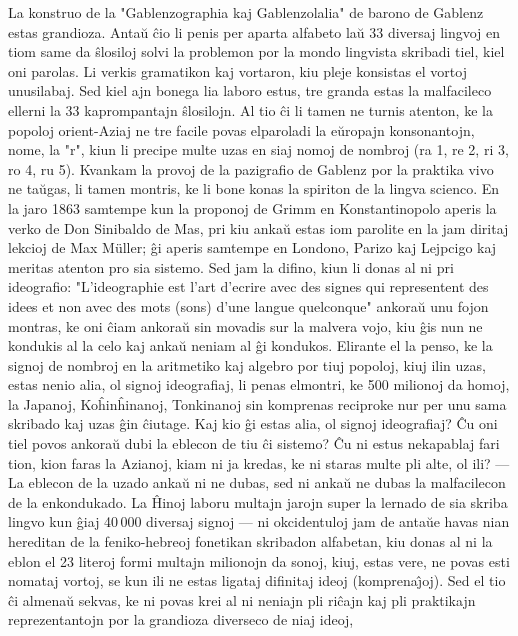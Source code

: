    La konstruo de la "Gablenzographia kaj Gablenzolalia" de barono
de Gablenz estas grandioza. Anta\u u \^cio li penis per aparta
alfabeto la\u u 33 diversaj lingvoj en tiom same da \^slosiloj solvi
la problemon por la mondo lingvista skribadi tiel, kiel oni parolas.
Li verkis gramatikon kaj vortaron, kiu pleje konsistas el vortoj
unusilabaj. Sed kiel ajn bonega lia laboro estus, tre granda estas
la malfacileco ellerni la 33 kaprompantajn \^slosilojn. Al tio \^ci
li tamen ne turnis atenton, ke la popoloj orient-Aziaj ne tre facile
povas elparoladi la e\u uropajn konsonantojn, nome, la "r", kiun
li precipe multe uzas en siaj nomoj de nombroj (ra 1, re 2, ri 3, ro
4, ru 5). Kvankam la provoj de la pazigrafio de Gablenz por la
praktika vivo ne ta\u ugas, li tamen montris, ke li bone konas la
spiriton de la lingva scienco. En la jaro 1863 samtempe kun la
proponoj de Grimm en Konstantinopolo aperis la verko de Don
Sinibaldo de Mas, pri kiu anka\u u estas iom parolite en la jam
diritaj lekcioj de Max Müller; \^gi aperis samtempe en Londono,
Parizo kaj Lejpcigo kaj meritas atenton pro sia sistemo. Sed jam la
difino, kiun li donas al ni pri ideografio: "L'ideographie est
l'art d'ecrire avec des signes qui representent des idees et non
avec des mots (sons) d'une langue quelconque" ankora\u u unu fojon
montras, ke oni \^ciam ankora\u u sin movadis sur la malvera vojo,
kiu \^gis nun ne kondukis al la celo kaj anka\u u neniam al \^gi
kondukos. Elirante el la penso, ke la signoj de nombroj en la
aritmetiko kaj algebro por tiuj popoloj, kiuj ilin uzas, estas nenio
alia, ol signoj ideografiaj, li penas elmontri, ke 500 milionoj da
homoj, la Japanoj, Ko\^hin\^hinanoj, Tonkinanoj sin komprenas
reciproke nur per unu sama skribado kaj uzas \^gin \^ciutage. Kaj
kio \^gi estas alia, ol signoj ideografiaj? \^Cu oni tiel povos
ankora\u u dubi la eblecon de tiu \^ci sistemo? \^Cu ni estus
nekapablaj fari tion, kion faras la Azianoj, kiam ni ja kredas, ke
ni staras multe pli alte, ol ili? --- La eblecon de la uzado anka\u
u ni ne dubas, sed ni anka\u u ne dubas la malfacilecon de la
enkondukado. La \^Hinoj laboru multajn jarojn super la lernado de
sia skriba lingvo kun \^giaj 40\,000 diversaj signoj --- ni
okcidentuloj jam de anta\u ue havas nian hereditan de la
feniko-hebreoj fonetikan skribadon alfabetan, kiu donas al ni la
eblon el 23 literoj formi multajn milionojn da sonoj, kiuj, estas
vere, ne povas esti nomataj vortoj, se kun ili ne estas ligataj
difinitaj ideoj (komprena\^{\j}oj). Sed el tio \^ci almena\u u
sekvas, ke ni povas krei al ni neniajn pli ri\^cajn kaj pli
praktikajn reprezentantojn por la grandioza diverseco de niaj ideoj,
